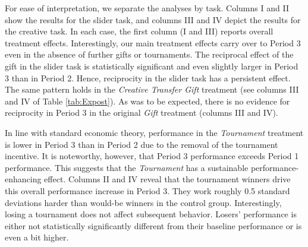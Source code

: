 For ease of interpretation, we separate the analyses by task. Columns I and II show the results for the slider task, and columns III and IV 
depict the results for the creative task. In each case, the first column (I and III) reports 
overall treatment effects. 
Interestingly, our main treatment effects carry over to Period 3 
even in the absence of further gifts or tournaments. 
The reciprocal effect of the gift in the slider task is statistically significant and even slightly larger 
in Period 3 than in Period 2. Hence, reciprocity in the slider task has a persistent effect. 
The same pattern holds in the \textit{Creative Transfer Gift} treatment 
(see columns III and IV of Table \ref{tab:Expost}). As was to be expected, there 
is no evidence for reciprocity in Period 3 in the original \textit{Gift} treatment (columns III and IV). 

  
In line with standard economic theory, performance in the \textit{Tournament} treatment is lower in Period 3 than in Period 2 due to the removal of the tournament incentive. It is noteworthy, however, that Period 3 performance exceeds Period 1 performance. This suggests that the \textit{Tournament} has a sustainable performance-enhancing effect. Columns II and IV reveal that the tournament winners drive this overall performance increase in Period 3. They work roughly 0.5 standard deviations harder than would-be winners in the control group. Interestingly, losing a tournament does not affect subsequent behavior. Losers' performance is either not statistically significantly different from their baseline performance or 
is even a bit higher. %


